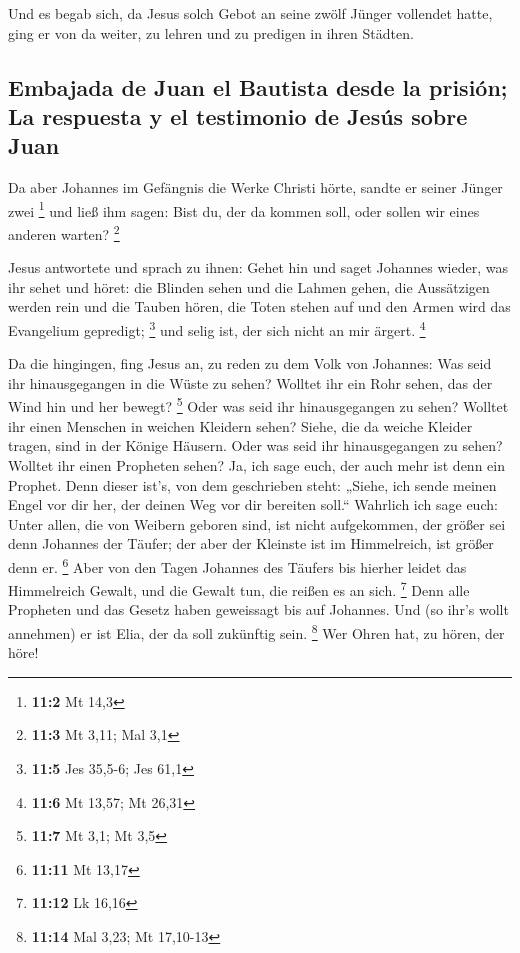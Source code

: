  Und es begab sich, da Jesus solch Gebot an seine zwölf
Jünger vollendet hatte, ging er von da weiter, zu lehren und zu predigen
in ihren Städten.

\hypertarget{embajada-de-juan-el-bautista-desde-la-prisiuxf3n-la-respuesta-y-el-testimonio-de-jesuxfas-sobre-juan}{%
\subsection{Embajada de Juan el Bautista desde la prisión; La respuesta
y el testimonio de Jesús sobre
Juan}\label{embajada-de-juan-el-bautista-desde-la-prisiuxf3n-la-respuesta-y-el-testimonio-de-jesuxfas-sobre-juan}}

 Da aber Johannes im Gefängnis die Werke Christi hörte,
sandte er seiner Jünger zwei \footnote{\textbf{11:2} Mt 14,3}
 und ließ ihm sagen: Bist du, der da kommen soll, oder
sollen wir eines anderen warten? \footnote{\textbf{11:3} Mt 3,11; Mal
  3,1}

 Jesus antwortete und sprach zu ihnen: Gehet hin und saget
Johannes wieder, was ihr sehet und höret:  die Blinden
sehen und die Lahmen gehen, die Aussätzigen werden rein und die Tauben
hören, die Toten stehen auf und den Armen wird das Evangelium gepredigt;
\footnote{\textbf{11:5} Jes 35,5-6; Jes 61,1}  und selig
ist, der sich nicht an mir ärgert. \footnote{\textbf{11:6} Mt 13,57; Mt
  26,31}

 Da die hingingen, fing Jesus an, zu reden zu dem Volk von
Johannes: Was seid ihr hinausgegangen in die Wüste zu sehen? Wolltet ihr
ein Rohr sehen, das der Wind hin und her bewegt? \footnote{\textbf{11:7}
  Mt 3,1; Mt 3,5}  Oder was seid ihr hinausgegangen zu
sehen? Wolltet ihr einen Menschen in weichen Kleidern sehen? Siehe, die
da weiche Kleider tragen, sind in der Könige Häusern. 
Oder was seid ihr hinausgegangen zu sehen? Wolltet ihr einen Propheten
sehen? Ja, ich sage euch, der auch mehr ist denn ein Prophet.
 Denn dieser ist's, von dem geschrieben steht: „Siehe,
ich sende meinen Engel vor dir her, der deinen Weg vor dir bereiten
soll.``  Wahrlich ich sage euch: Unter allen, die von
Weibern geboren sind, ist nicht aufgekommen, der größer sei denn
Johannes der Täufer; der aber der Kleinste ist im Himmelreich, ist
größer denn er. \footnote{\textbf{11:11} Mt 13,17}  Aber
von den Tagen Johannes des Täufers bis hierher leidet das Himmelreich
Gewalt, und die Gewalt tun, die reißen es an sich. \footnote{\textbf{11:12}
  Lk 16,16}  Denn alle Propheten und das Gesetz haben
geweissagt bis auf Johannes.  Und (so ihr's wollt
annehmen) er ist Elia, der da soll zukünftig sein. \footnote{\textbf{11:14}
  Mal 3,23; Mt 17,10-13}  Wer Ohren hat, zu hören, der
höre!

